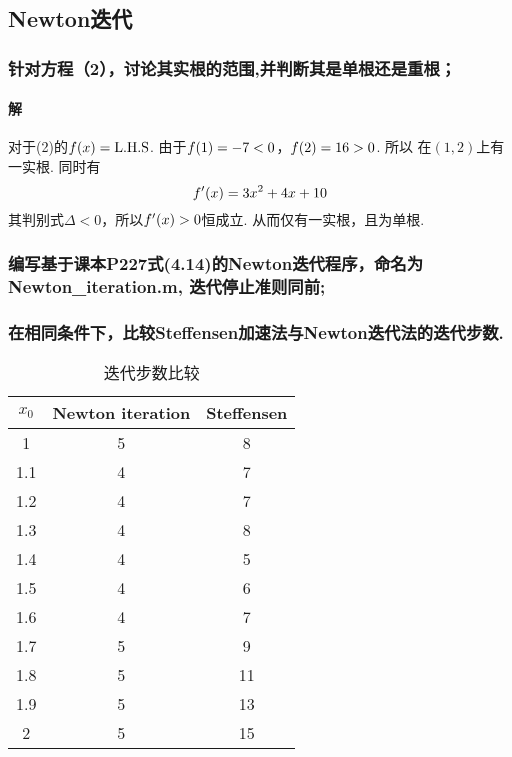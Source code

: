 \vspace{1cm}
\subsection{Newton迭代}
\subsubsection{针对方程（2），讨论其实根的范围,并判断其是单根还是重根；}
  \paragraph{解}
    对于(2)的$\mathnormal{f}(x)=\text{L.H.S}$. 由于$\mathnormal{f}(1) = -7 <0$，$\mathnormal{f}(2) = 16 > 0$. 所以
    在$(1, 2)$上有一实根. 同时有
    \[
      \mathnormal{f}^{\prime}(x) = 3x^2 + 4x + 10
    \]
    其判别式$\Delta<0$，所以$\mathnormal{f}^{\prime}(x)>0$恒成立. 从而仅有一实根，且为单根.

\subsubsection{编写基于课本P227式(4.14)的Newton迭代程序，命名为Newton\_iteration.m, 迭代停止准则同前;}
  
  

\subsubsection{在相同条件下，比较Steffensen加速法与Newton迭代法的迭代步数.}
  
  \begin{table}[htbp]
    \caption{迭代步数比较}
    \centering
    \begin{tabular}{c|cc}
      \toprule
      $x_0$ & Newton iteration & Steffensen \\
      \midrule
      1	& 5	& 8 \\
      1.1&	4&	7\\
      1.2&	4&	7 \\
      1.3&	4&	8\\
      1.4&	4&	5\\
      1.5&	4&	6\\
      1.6&	4&	7\\
      1.7&	5&	9\\
      1.8&	5&	11\\
      1.9&	5&	13\\
      2  & 	5&	15 \\
      \bottomrule
    \end{tabular}
  \end{table}

